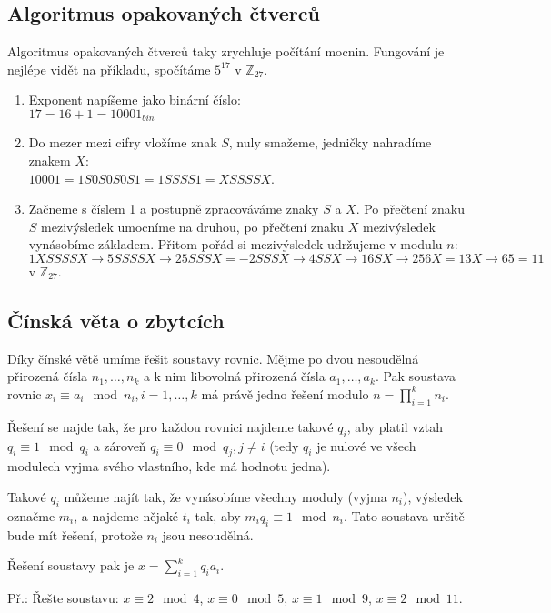 \documentclass[10pt,a4paper]{article}
\begin{document}
\subsection{Algoritmus opakovaných čtverců}
Algoritmus opakovaných čtverců taky zrychluje počítání mocnin. Fungování je nejlépe vidět na příkladu, spočítáme $5^{17}$ v $\mathbb{Z}_{27}$.
\begin{enumerate}
\item Exponent napíšeme jako binární číslo:\\ $17 = 16 + 1 = 10001_{bin}$
\item Do mezer mezi cifry vložíme znak $S$, nuly smažeme, jedničky nahradíme znakem $X$:\\ $10001 = 1S0S0S0S1 = 1SSSS1 = XSSSSX$.
\item Začneme s číslem 1 a postupně zpracováváme znaky $S$ a $X$. Po přečtení znaku $S$ mezivýsledek umocníme na druhou, po přečtení znaku $X$ mezivýsledek vynásobíme základem. Přitom pořád si mezivýsledek udržujeme v modulu $n$:\\ $1XSSSSX \rightarrow 5SSSSX \rightarrow 25SSSX = -2SSSX \rightarrow 4SSX \rightarrow 16SX \rightarrow 256X = 13X \rightarrow 65 = 11$ v $\mathbb{Z}_{27}$.
\end{enumerate}

\subsection{Čínská věta o zbytcích}
Díky čínské větě umíme řešit soustavy rovnic. Mějme po dvou nesoudělná přirozená čísla $n_1, \ldots, n_k$ a k nim libovolná přirozená čísla $a_1,\ldots,a_k$. Pak soustava rovnic $x_i \equiv a_i \mod n_i, i = 1,\ldots,k$ má právě jedno řešení modulo $n = \prod_{i=1}^{k}n_i$.

Řešení se najde tak, že pro každou rovnici najdeme takové $q_i$, aby platil vztah $q_i \equiv 1 \mod q_i$ a zároveň $q_i \equiv 0 \mod q_j, j \neq i$ (tedy $q_i$ je nulové ve všech modulech vyjma svého vlastního, kde má hodnotu jedna).

Takové $q_i$ můžeme najít tak, že vynásobíme všechny moduly (vyjma $n_i$), výsledek označme $m_i$, a najdeme nějaké $t_i$ tak, aby $m_iq_i \equiv 1 \mod n_i$. Tato soustava určitě bude mít řešení, protože $n_i$ jsou nesoudělná.

Řešení soustavy pak je $x = \sum_{i=1}^{k}q_ia_i$.

Př.: Řešte soustavu: $x \equiv 2 \mod 4$, $x \equiv 0 \mod 5$, $x \equiv 1 \mod 9$, $x \equiv 2 \mod 11$.
\end{document}
